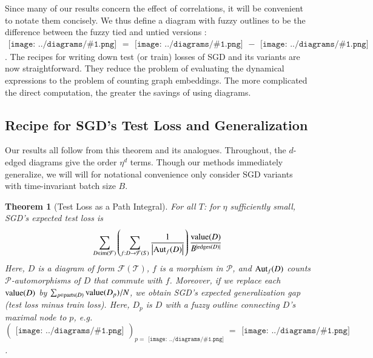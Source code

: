 \documentclass{article}
\newtheorem{thm}{Theorem}
\newcommand{\Free}{\mathcal{F}}
\newcommand{\Aut}{\text{\textnormal{Aut}}}
\newcommand{\image}{\text{\textnormal{im}}}
\newcommand{\dvalue}{\text{\textnormal{value}}}
\newcommand{\edges}{\text{\textnormal{edges}}}
\newcommand{\parts}{\text{\textnormal{parts}}}
\newcommand{\Pp}{\mathcal{P}}
\newcommand{\Tt}{\mathcal{T}}
\newcommand{\wrap}[1]{\left(#1\right)}
\newcommand{\wabs}[1]{\left|#1\right|}
\newcommand{\sdia}[1]{\begin{gathered}\texttt{[image: ../diagrams/\#1.png]}\end{gathered}}
\begin{document}
        Since many of our results concern the effect of correlations, it will
        be convenient to notate them concisely.  We thus define a diagram with
        fuzzy outlines to be the difference between the fuzzy tied and untied
        versions : $\sdia{c(01-2)(01-12)} =
        \sdia{(01-2)(01-12)}-\sdia{(0-1-2)(01-12)}$.  
        The recipes for writing down test (or train) losses of SGD and its
        variants are now straightforward.  They reduce the problem of
        evaluating the dynamical expressions to the problem of
        counting graph embeddings.  The more complicated the direct
        computation, the greater the savings of using diagrams.  
    

    \subsection{Recipe for SGD's Test Loss and Generalization}

        Our results all follow from this theorem and its analogues.
        Throughout, the $d$-edged diagrams give the order $\eta^d$ terms.
        Though our methods immediately generalize, we will will for notational
        convenience only consider SGD variants with time-invariant batch size
        $B$. 
        \begin{thm}[Test Loss as a Path Integral] \label{thm:sgdcoef}
            For all $T$: for $\eta$ sufficiently small, SGD's expected test
            loss is
            \begin{equation}\label{eq:sgdcoef}
                \sum_{D \in \image(\Free)} \wrap{
                    \sum_{f: D\to\Free(S)}
                    \frac{1}{\wabs{\Aut_f(D)}}
                }
                \frac{\dvalue(D)}{B^{|\edges(D)|}}
            \end{equation}
            Here, $D$ is a diagram of form $\Free(\Tt)$,
            $f$ is a morphism in $\Pp$, and $\Aut_f(D)$ counts
            $\Pp$-automorphisms of $D$ that commute with $f$. 
            Moreover, if we replace each $\dvalue(D)$ by
            $
                \sum_{p \in \parts(D)} \dvalue(D_p)/N
            $, we obtain
            SGD's expected generalization gap (test loss minus train loss).
            Here, $D_p$ is $D$ with a fuzzy outline connecting $D$'s maximal
            node to $p$, e.g. $(\sdia{(0-1)(01)})_{p=\sdia{(0)()}} =
            \sdia{c(01)(01)}$.
        \end{thm}
    
\end{document}
